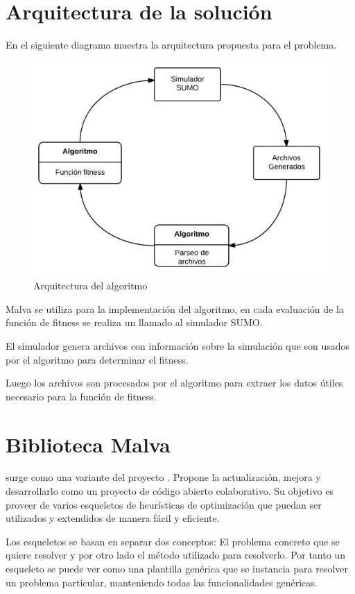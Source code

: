 \section{Arquitectura de la solución}

En el siguiente diagrama muestra la arquitectura propuesta para el problema.

\begin{figure}[H]
\centering
\includegraphics[width=0.7\linewidth]{Figures/arquitectura1}
\caption{Arquitectura del algoritmo}
\label{fig:arquitectura1}
\end{figure}


Malva se utiliza para la implementación del algoritmo, en cada evaluación de la función de fitness se realiza un llamado al simulador SUMO. 

El simulador genera archivos con información sobre la simulación que son usados por el algoritmo para determinar el fitness.

Luego los archivos son procesados por el algoritmo para extraer los datos útiles necesario para la función de fitness.







\section{Biblioteca Malva}

\citep{Malva} surge como una variante del proyecto \citep{Mallba}. Propone la actualización, mejora y desarrollarlo como un proyecto de código abierto colaborativo.  Su objetivo es proveer de varios esqueletos de  heurísticas de optimización que puedan ser utilizados y extendidos de manera fácil y eficiente.

Los esqueletos se basan en separar dos conceptos: El problema concreto que se quiere resolver y por otro lado el método utilizado para resolverlo. Por tanto un esqueleto se puede ver como una plantilla genérica que se instancia para resolver un problema particular, manteniendo todas las funcionalidades genéricas.

